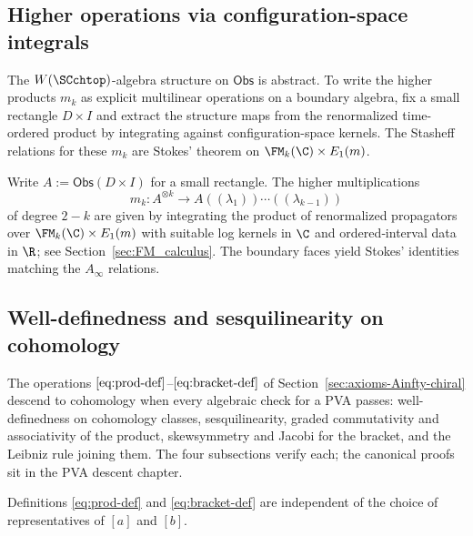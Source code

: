 \subsection{Higher operations via configuration-space integrals}
\label{subsec:mk-integrals}

The $W(\SCchtop)$-algebra structure on $\mathsf{Obs}$ is abstract.
To write the higher products $m_k$ as explicit multilinear operations
on a boundary algebra, fix a small rectangle $D \times I$ and
extract the structure maps from the renormalized time-ordered
product by integrating against configuration-space kernels. The
Stasheff relations for these $m_k$ are Stokes' theorem on
$\FM_k(\C) \times E_1(m)$.

Write $A:=\mathsf{Obs}(D\times I)$ for a small rectangle. The higher multiplications
\[
m_k : A^{\otimes k}\longrightarrow A((\lambda_1))\cdots((\lambda_{k-1}))
\]
of degree $2-k$ are given by integrating the product of renormalized propagators over $\FM_k(\C)\times E_1(m)$ with suitable log kernels in $\C$ and ordered‑interval data in $\R$; see Section~\ref{sec:FM_calculus}.
The boundary faces yield Stokes' identities matching the $A_\infty$ relations.

\subsection{Well-definedness and sesquilinearity on cohomology}
\label{subsec:well-def-sesqui}

The operations $\eqref{eq:prod-def}$--$\eqref{eq:bracket-def}$ of
Section~\ref{sec:axioms-Ainfty-chiral} descend to cohomology when every algebraic check for a PVA passes: well-definedness
on cohomology classes, sesquilinearity, graded commutativity and
associativity of the product, skewsymmetry and Jacobi for the
bracket, and the Leibniz rule joining them. The four
subsections verify each; the canonical proofs sit in the
PVA descent chapter.

\begin{lemma}
\label{lem:well-definedness-prod-bracket}
Definitions \eqref{eq:prod-def} and \eqref{eq:bracket-def} are independent of the choice of representatives of $[a]$ and $[b]$.
\end{lemma}

